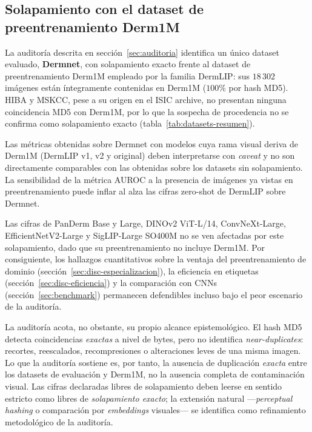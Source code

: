 \subsection{Solapamiento con el dataset de preentrenamiento Derm1M}
\label{sec:lim-leakage}

La auditoría descrita en sección~\ref{sec:auditoria} identifica un
único dataset evaluado, \textbf{Dermnet}, con solapamiento exacto
frente al dataset de preentrenamiento Derm1M empleado por la familia
DermLIP: sus $18\,302$ imágenes están íntegramente contenidas en
Derm1M ($100\%$ por hash MD5). HIBA y MSKCC, pese a su origen en el
ISIC archive, no presentan ninguna coincidencia MD5 con Derm1M, por
lo que la sospecha de procedencia no se confirma como solapamiento
exacto (tabla~\ref{tab:datasets-resumen}).

Las métricas obtenidas sobre Dermnet con modelos cuya rama visual
deriva de Derm1M (DermLIP v1, v2 y original) deben interpretarse con
\emph{caveat} y no son directamente comparables con las obtenidas
sobre los datasets sin solapamiento. La sensibilidad de la métrica
AUROC a la presencia de imágenes ya vistas en preentrenamiento puede
inflar al alza las cifras zero-shot de DermLIP sobre Dermnet.

Las cifras de PanDerm Base y Large, DINOv2 ViT-L/14,
ConvNeXt-Large, EfficientNetV2-Large y SigLIP-Large SO400M no se
ven afectadas por este solapamiento, dado que su preentrenamiento
no incluye Derm1M. Por consiguiente, los hallazgos cuantitativos
sobre la ventaja del preentrenamiento de dominio
(sección~\ref{sec:disc-especializacion}), la eficiencia en etiquetas
(sección~\ref{sec:disc-eficiencia}) y la comparación con CNNs
(sección~\ref{sec:benchmark}) permanecen defendibles incluso bajo el
peor escenario de la auditoría.

La auditoría acota, no obstante, su propio alcance epistemológico. El
hash MD5 detecta coincidencias \emph{exactas} a nivel de bytes, pero
no identifica \emph{near-duplicates}: recortes, reescalados,
recompresiones o alteraciones leves de una misma imagen. Lo que la
auditoría sostiene es, por tanto, la ausencia de duplicación
\emph{exacta} entre los datasets de evaluación y Derm1M, no la
ausencia completa de contaminación visual. Las cifras declaradas
libres de solapamiento deben leerse en sentido estricto como libres de
\emph{solapamiento exacto}; la extensión natural ---\emph{perceptual
hashing} o comparación por \emph{embeddings} visuales--- se identifica
como refinamiento metodológico de la auditoría.

